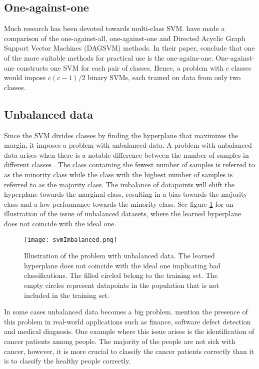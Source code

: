 \subsection{One-against-one}
Much research has been devoted towards multi-class SVM. \citet{Hsu2002} have made a comparison of the one-against-all, one-against-one and Directed Acyclic Graph Support Vector Machines (DAGSVM) methods. In their paper, \citet{Hsu2002} conclude that one of the more suitable methods for practical use is the one-agains-one. One-against-one constructs one SVM for each pair of classes. Hence, a problem with $c$ classes would impose $c(c-1)/2$ binary SVMs, each trained on data from only two classes.

\subsection{Unbalanced data \label{unbalanced}}
Since the SVM divides classes by finding the hyperplane that maximizes the margin, it imposes a problem with unbalanced data. A problem with unbalanced data arises when there is a notable difference between the number of samples in different classes \cite{delRio2014}. The class containing the fewest number of samples is referred to as the minority class while the class with the highest number of samples is referred to as the majority class. The imbalance of datapoints will shift the hyperplane towards the marginal class, resulting in a bias towards the majority class and a low performance towards the minority class. See figure \ref{unbalancedSVM} for an illustration of the issue of unbalanced datasets, where the learned hyperplane does not coincide with the ideal one. 

\begin{figure}[h!]
    \centering
    \texttt{[image: svmImbalanced.png]}
    \caption{Illustration of the problem with unbalanced data. The learned hyperplane does not coincide with the ideal one implicating bad classifications. The filled circled belong to the training set. The empty circles represent datapoints in the population that is not included in the training set.}
    \label{unbalancedSVM}
\end{figure}

In some cases unbalanced data becomes a big problem. \citet{delRio2014} mention the presence of this problem in real-world applications such as finance, software defect detection and medical diagnosis. One example where this issue arises is the identification of cancer patients among people. The majority of the people are not sick with cancer, however, it is more crucial to classify the cancer patients correctly than it is to classify the healthy people correctly. 

